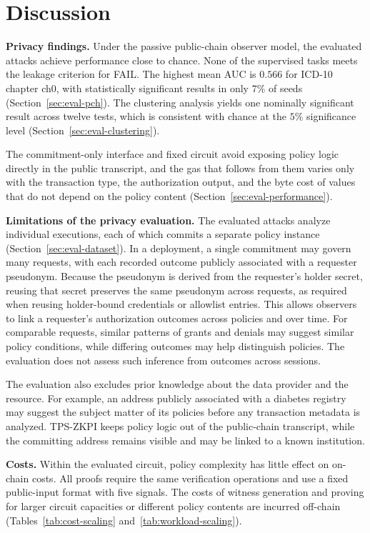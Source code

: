 \section{Discussion}
\label{sec:discussion}

\textbf{Privacy findings.}
Under the passive public-chain observer model, the evaluated attacks achieve performance close to chance.
None of the supervised tasks meets the leakage criterion for FAIL.
The highest mean AUC is $0.566$ for ICD-10 chapter ch0, with statistically significant results in only $7\%$ of seeds (Section~\ref{sec:eval-pch}).
The clustering analysis yields one nominally significant result across twelve tests, which is consistent with chance at the $5\%$ significance level (Section~\ref{sec:eval-clustering}).

The commitment-only interface and fixed circuit avoid exposing policy logic directly in the public transcript, and the gas that follows from them varies only with the transaction type, the authorization output, and the byte cost of values that do not depend on the policy content (Section~\ref{sec:eval-performance}).

\textbf{Limitations of the privacy evaluation.}
The evaluated attacks analyze individual executions, each of which commits a separate policy instance (Section~\ref{sec:eval-dataset}).
In a deployment, a single commitment may govern many requests, with each recorded outcome publicly associated with a requester pseudonym.
Because the pseudonym is derived from the requester's holder secret, reusing that secret preserves the same pseudonym across requests, as required when reusing holder-bound credentials or allowlist entries.
This allows observers to link a requester's authorization outcomes across policies and over time.
For comparable requests, similar patterns of grants and denials may suggest similar policy conditions, while differing outcomes may help distinguish policies.
The evaluation does not assess such inference from outcomes across sessions.

The evaluation also excludes prior knowledge about the data provider and the resource.
For example, an address publicly associated with a diabetes registry may suggest the subject matter of its policies before any transaction metadata is analyzed.
TPS-ZKPI keeps policy logic out of the public-chain transcript, while the committing address remains visible and may be linked to a known institution.

\textbf{Costs.} Within the evaluated circuit, policy complexity has little effect on on-chain costs.
All proofs require the same verification operations and use a fixed public-input format with five signals.
The costs of witness generation and proving for larger circuit capacities or different policy contents are incurred off-chain (Tables~\ref{tab:cost-scaling} and~\ref{tab:workload-scaling}).

